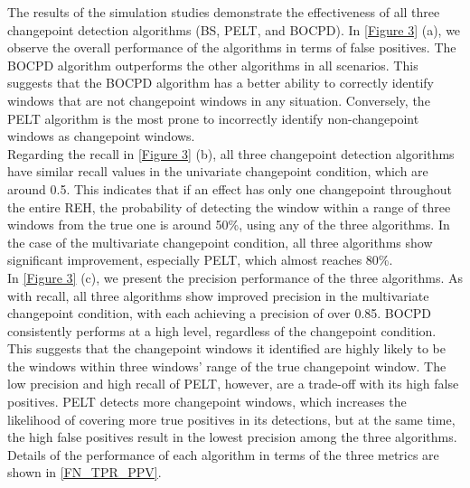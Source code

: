 \documentclass[]{interact}
\theoremstyle{plain}%
\theoremstyle{definition}
\theoremstyle{remark}
\begin{document}
	The results of the simulation studies demonstrate the effectiveness of all three changepoint detection algorithms (BS, PELT, and BOCPD). In \autoref{Figure 3} (a), we observe the overall performance of the algorithms in terms of false positives. The BOCPD algorithm outperforms the other algorithms in all scenarios. This suggests that the BOCPD algorithm has a better ability to correctly identify windows that are not changepoint windows in any situation. Conversely, the PELT algorithm is the most prone to incorrectly identify non-changepoint windows as changepoint windows. \\
	
	Regarding the recall in \autoref{Figure 3} (b), all three changepoint detection algorithms have similar recall values in the univariate changepoint condition, which are around 0.5. This indicates that if an effect has only one changepoint throughout the entire REH, the probability of detecting the window within a range of three windows from the true one is around 50\%, using any of the three algorithms. In the case of the multivariate changepoint condition, all three algorithms show significant improvement, especially PELT, which almost reaches 80\%. \\
	
	In \autoref{Figure 3} (c), we present the precision performance of the three algorithms. As with recall, all three algorithms show improved precision in the multivariate changepoint condition, with each achieving a precision of over 0.85. BOCPD consistently performs at a high level, regardless of the changepoint condition. This suggests that the changepoint windows it identified are highly likely to be the windows within three windows' range of the true changepoint window. The low precision and high recall of PELT, however, are a trade-off with its high false positives. PELT detects more changepoint windows, which increases the likelihood of covering more true positives in its detections, but at the same time, the high false positives result in the lowest precision among the three algorithms. Details of the performance of each algorithm in terms of the three metrics are shown in \autoref{FN_TPR_PPV}.
	
\end{document}
